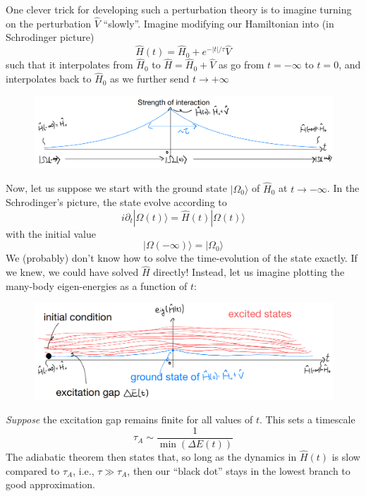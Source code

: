 One clever trick for developing such a perturbation theory is to imagine turning on the perturbation $\hat{V}$ ``slowly''. Imagine modifying our Hamiltonian into (in Schrodinger picture)
\[ \hat{H}\left( t \right) =\hat{H}_0+e^{-\left| t \right|/\tau}\hat{V}\]
such that it interpolates from $\hat{H}_0$ to $\hat{H}=\hat{H}_0+\hat{V}$ as go from $t=-\infty$ to $t=0$, and interpolates back to $\hat{H}_0$ as we further send $t\to +\infty$

\begin{figure}[ht]
    \centering
    \includegraphics[width=\textwidth]{jupyterbook/data/fig/lec14-fig01.png}
\end{figure}

Now, let us suppose we start with the ground state $|\Omega_0\rangle$ of $\hat{H}_0$ at $t\to -\infty$. In the Schrodinger's picture, the state evolve according to
\[ i\partial _t|\Omega \left( t \right) \rangle =\hat{H}\left( t \right) |\Omega \left( t \right) \rangle \]
with the initial value
\[ |\Omega \left( -\infty \right) \rangle =|\Omega _0\rangle \]
We (probably) don't know how to solve the time-evolution of the state exactly. If we knew, we could have solved $\hat{H}$ directly! Instead, let us imagine plotting the many-body eigen-energies as a function of $t$:

\begin{figure}[ht]
    \centering
    \includegraphics[width=\textwidth]{jupyterbook/data/fig/lec14-fig02.png}
\end{figure}

\emph{Suppose} the excitation gap remains finite for all values of $t$. This sets a timescale
\[ \tau _A\sim \frac{1}{\min \left( \Delta E\left( t \right) \right)}\]
The adiabatic theorem then states that, so long as the dynamics in $\hat{H}(t)$ is slow compared to $\tau_A$, i.e., $\tau\gg \tau_A$, then our ``black dot'' stays in the lowest branch to good approximation.

